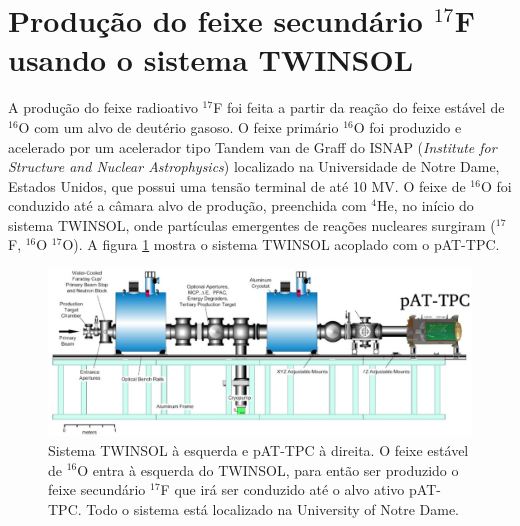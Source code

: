 \documentclass[a4paper,12pt,oneside]{book}
\begin{document}

\section{Produção do feixe secundário $^{17}$F usando o sistema TWINSOL}

\par A produção do feixe radioativo $^{17}$F foi feita a partir da reação do feixe estável de $^{16}$O com um alvo de deutério gasoso. O feixe primário $^{16}$O foi produzido e acelerado por um acelerador tipo Tandem van de Graff do ISNAP (\textit{Institute for Structure and Nuclear Astrophysics}) localizado na Universidade de Notre Dame, Estados Unidos, que possui uma tensão terminal de até 10 MV\cite{KOLATA1989503, NDtandem}. O feixe de $^{16}$O foi conduzido até a câmara alvo de produção, preenchida com $^4$He, no início do sistema TWINSOL, onde partículas emergentes de reações nucleares surgiram ($^{17}$F, $^{16}$O $^{17}$O). A figura \ref{fig:twinsol+pattpc} mostra o sistema TWINSOL acoplado com o pAT-TPC.

\begin{figure}[H]
    \centering
    \includegraphics[scale = 0.35]{figs/poster3.jpeg}
    \caption{Sistema TWINSOL à esquerda e pAT-TPC à direita. O feixe estável de $^{16}$O entra à esquerda do TWINSOL, para então ser produzido o feixe secundário $^{17}$F que irá ser conduzido até o alvo ativo pAT-TPC. Todo o sistema está localizado na University of Notre Dame.}
    \label{fig:twinsol+pattpc}
\end{figure}
\end{document}
